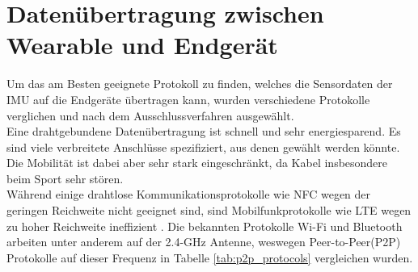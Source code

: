 \section{Datenübertragung zwischen Wearable und Endgerät}
\label{ch:bleAndMesh}
Um das am Besten geeignete Protokoll zu finden, welches die Sensordaten der IMU auf die Endgeräte übertragen kann, wurden verschiedene Protokolle verglichen und nach dem Ausschlussverfahren ausgewählt.\\
Eine drahtgebundene Datenübertragung ist schnell und sehr energiesparend.
Es sind viele verbreitete Anschlüsse spezifiziert, aus denen gewählt werden könnte.
Die Mobilität ist dabei aber sehr stark eingeschränkt, da Kabel insbesondere beim Sport sehr stören.\\
Während einige drahtlose Kommunikationsprotokolle wie NFC wegen der geringen Reichweite nicht geeignet sind, sind Mobilfunkprotokolle wie LTE wegen zu hoher Reichweite ineffizient \cite{comparison_wifi_lte}.
Die bekannten Protokolle Wi-Fi und Bluetooth arbeiten unter anderem auf der 2.4-GHz Antenne, weswegen Peer-to-Peer(P2P) Protokolle auf dieser Frequenz in Tabelle \ref{tab:p2p_protocols} vergleichen wurden.\\
